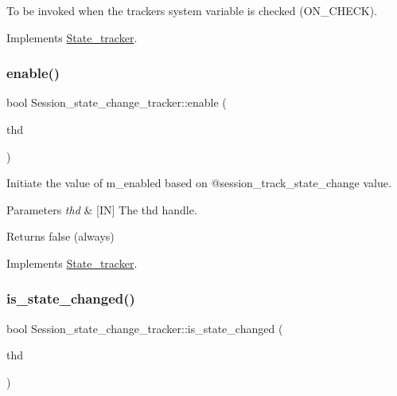 To be invoked when the tracker\textquotesingle{}s system variable is checked (O\+N\+\_\+\+C\+H\+E\+CK). 

Implements \mbox{\hyperlink{classState__tracker_a50923266a6300e657b70dc4f0125782c}{State\+\_\+tracker}}.

\mbox{\label{classSession__state__change__tracker_a3ec79835d60171eb55647f978ee34220}} 
\subsubsection{\texorpdfstring{enable()}{enable()}}
{\footnotesize\ttfamily bool Session\+\_\+state\+\_\+change\+\_\+tracker\+::enable (\begin{DoxyParamCaption}\item[{T\+HD $\ast$}]{thd }\end{DoxyParamCaption})\hspace{0.3cm}{\ttfamily [virtual]}}



Initiate the value of m\+\_\+enabled based on @session\+\_\+track\+\_\+state\+\_\+change value. 


\begin{DoxyParams}{Parameters}
{\em thd} & \mbox{[}IN\mbox{]} The thd handle. \\
\hline
\end{DoxyParams}
\begin{DoxyReturn}{Returns}
false (always) 
\end{DoxyReturn}


Implements \mbox{\hyperlink{classState__tracker_a65cd4b0d77f079f4c41620c0bf314939}{State\+\_\+tracker}}.

\mbox{\label{classSession__state__change__tracker_a97659fcaef646c626dfd0ea57863cf6f}} 
\subsubsection{\texorpdfstring{is\+\_\+state\+\_\+changed()}{is\_state\_changed()}}
{\footnotesize\ttfamily bool Session\+\_\+state\+\_\+change\+\_\+tracker\+::is\+\_\+state\+\_\+changed (\begin{DoxyParamCaption}\item[{T\+HD $\ast$}]{thd }\end{DoxyParamCaption})}



